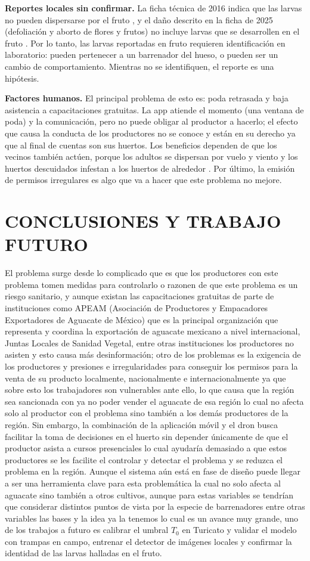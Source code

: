 \documentclass[conference]{IEEEtran}
\begin{document}
\textbf{Reportes locales sin confirmar.} La ficha técnica de 2016 indica que las larvas no pueden dispersarse por el fruto \cite{ref1}, y el daño descrito en la ficha de 2025 (defoliación y aborto de flores y frutos) no incluye larvas que se desarrollen en el fruto \cite{ref6}. Por lo tanto, las larvas reportadas en fruto requieren identificación en laboratorio: pueden pertenecer a un barrenador del hueso, o pueden ser un cambio de comportamiento. Mientras no se identifiquen, el reporte es una hipótesis.

\textbf{Factores humanos.} El principal problema de esto es: poda retrasada y baja asistencia a capacitaciones gratuitas. La app atiende el momento (una ventana de poda) y la comunicación, pero no puede obligar al productor a hacerlo; el efecto que causa la conducta de los productores no se conoce y están en su derecho ya que al final de cuentas son sus huertos. Los beneficios dependen de que los vecinos también actúen, porque los adultos se dispersan por vuelo y viento \cite{ref6} y los huertos descuidados infestan a los huertos de alrededor \cite{ref1}. Por último, la emisión de permisos irregulares es algo que va a hacer que este problema no mejore.
\newpage
\section{CONCLUSIONES Y TRABAJO FUTURO}
El problema surge desde lo complicado que es que los productores con este problema tomen medidas para controlarlo o razonen de que este problema es un riesgo sanitario, y aunque existan las capacitaciones gratuitas de parte de instituciones como APEAM (Asociación de Productores y Empacadores Exportadores de Aguacate de México) que es la principal organización que representa y coordina la exportación de aguacate mexicano a nivel internacional, Juntas Locales de Sanidad Vegetal, entre otras instituciones los productores no asisten y esto causa más desinformación; otro de los problemas es la exigencia de los productores y presiones e irregularidades para conseguir los permisos para la venta de su producto  localmente, nacionalmente e internacionalmente ya que sobre esto los trabajadores son vulnerables ante ello, lo que causa que la región sea sancionada con ya no poder vender el aguacate de esa región lo cual no afecta solo al productor con el problema sino también a los demás productores de la región.
Sin embargo, la combinación de la aplicación móvil y el dron busca facilitar la toma de decisiones en el huerto sin depender únicamente de que el productor asista a cursos presenciales lo cual ayudaría demasiado a que estos productores se les facilite el controlar y detectar el problema y se reduzca el problema en la región. Aunque el sistema aún está en fase de diseño puede llegar a ser una herramienta clave para esta problemática la cual no solo afecta al aguacate sino también a otros cultivos, aunque para estas variables se tendrían que considerar distintos puntos de vista por la especie de barrenadores entre otras variables las bases y la idea ya la tenemos lo cual es un avance muy grande, uno de los trabajos a futuro es calibrar el umbral $T_0$ en Turicato y validar el modelo con trampas en campo, entrenar el detector de imágenes locales y confirmar la identidad de las larvas halladas en el fruto.
\end{document}
